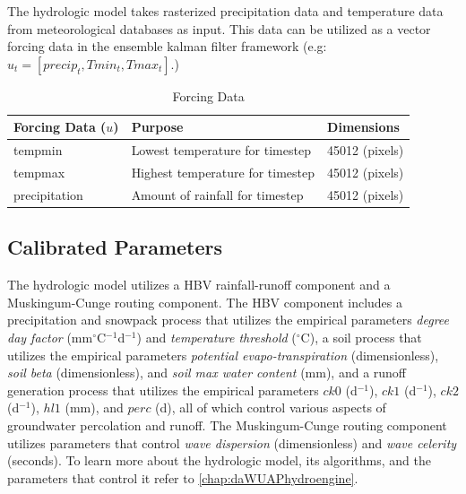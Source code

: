 The hydrologic model takes rasterized precipitation data and temperature data from meteorological databases as input. This data can be utilized as a vector forcing data in the ensemble kalman filter framework (e.g: $u_{t} = [precip_{t},Tmin_{t}, Tmax_{t}]$.)

\begin{table}[]
\caption{Forcing Data} 
\begin{tabular}{lll}
Forcing Data ($u$) & Purpose                          & Dimensions \\ \hline
tempmin          & Lowest temperature for timestep  & 45012 (pixels) \\
tempmax          & Highest temperature for timestep & 45012 (pixels) \\
precipitation      & Amount of rainfall for timestep & 45012  (pixels)
\end{tabular}
\label{tab:u_params}
\end{table}

\subsection{Calibrated Parameters}

The hydrologic model utilizes a HBV rainfall-runoff component and a Muskingum-Cunge routing component. The HBV component includes a precipitation and snowpack process that utilizes the empirical parameters \textit{degree day factor} (mm$^\circ$C$^{-1}$d$^{-1}$) and \textit{temperature threshold} ($^\circ$C), a soil process that utilizes the empirical parameters \textit{potential evapo-transpiration} (dimensionless), \textit{soil beta} (dimensionless), and \textit{soil max water content} (mm), and a runoff generation process that utilizes the empirical parameters $ck0$ (d$^{-1}$), $ck1$ (d$^{-1}$), $ck2$ (d$^{-1}$), $hl1$ (mm), and $perc$ (d), all of which control various aspects of groundwater percolation and runoff. The Muskingum-Cunge routing component utilizes parameters that control \textit{wave dispersion} (dimensionless) and \textit{wave celerity} (seconds). To learn more about the hydrologic model, its algorithms, and the parameters that control it refer to \autoref{chap:daWUAPhydroengine}.

